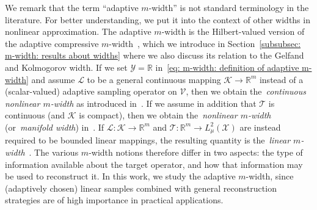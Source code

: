 \documentclass[namedate,webpdf]{ima-authoring-template-blank}
\numberwithin{counter}{section}
\numberwithin{equation}{section}
\theoremstyle{plain}
\theoremstyle{definition}
\newcommand*{\cK}{\mathcal{K}}
\newcommand*{\cL}{\mathcal{L}}
\newcommand*{\cT}{\mathcal{T}}
\newcommand*{\cV}{\mathcal{V}}
\newcommand*{\cX}{\mathcal{X}}
\newcommand*{\cY}{\mathcal{Y}}
\newcommand*{\bbR}{\mathbb{R}}
\theoremstyle{thmstyletwo}
\begin{document}
We remark that the term ``adaptive \(m\)-width'' is not standard terminology in the literature. For better understanding, we put it into the context of other widths in nonlinear approximation. 
The adaptive \(m\)-width is the Hilbert-valued version of the adaptive compressive \(m\)-width~\citep{foucart_MathematicalIntroductionCompressiveSensing_2013}, which we introduce in Section~\ref{subsubsec: m-width: results about widths} where we also discuss its relation to the Gelfand and Kolmogorov width.
If we set \( \cY = \bbR \) in~\eqref{eq: m-width: definition of adaptive m-width} and assume \(\cL\) to be a general continuous mapping \( \cK \to \bbR^m\) instead of a (scalar-valued) adaptive sampling operator on \( \cV \), then we obtain the~\emph{continuous nonlinear \(m\)-width} as introduced in~\citet{devore_OptimalNonlinearApproximation_1989}. If we assume in addition that \( \cT \) is continuous (and \( \cK \) is compact), then we obtain the~\emph{nonlinear \(m\)-width} (or~\emph{manifold width}) in~\citet{devore_NonlinearApproximation_1998}.
If \( \cL : \cK \to \bbR^m \) and \( \cT : \bbR^m \to L^2_{\mu}(\cX) \) are instead required to be bounded linear mappings, the resulting quantity is the~\emph{linear \(m\)-width}~\citep[Def. 4.1]{pinkus_NwidthsApproximationTheory_1985}.
The various \(m\)-width notions therefore differ in two aspects: the type of information available about the target operator, and how that information may be used to reconstruct it. In this work, we study the adaptive \(m\)-width, since (adaptively chosen) linear samples combined with general reconstruction strategies are of high importance in practical applications.
\end{document}

